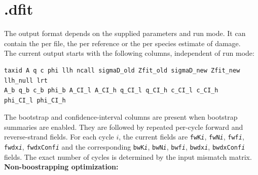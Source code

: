 \documentclass[10pt]{article}
\begin{document}
\section{.dfit}
The output format depends on the supplied parameters and run mode. It can contain the
per file, the per reference or the per species estimate of damage.\\ \noindent
The current output starts with the following columns, independent of run mode:
\begin{verbatim}
taxid A q c phi llh ncall sigmaD_old Zfit_old sigmaD_new Zfit_new llh_null lrt
A_b q_b c_b phi_b A_CI_l A_CI_h q_CI_l q_CI_h c_CI_l c_CI_h
phi_CI_l phi_CI_h
\end{verbatim}
The bootstrap and confidence-interval columns are present when bootstrap
summaries are enabled. They are followed by repeated per-cycle forward and
reverse-strand fields. For each cycle $i$, the current fields are
\texttt{fwK\textit{i}}, \texttt{fwN\textit{i}}, \texttt{fwf\textit{i}},
\texttt{fwdx\textit{i}}, \texttt{fwdxConf\textit{i}} and the corresponding
\texttt{bwK\textit{i}}, \texttt{bwN\textit{i}}, \texttt{bwf\textit{i}},
\texttt{bwdx\textit{i}}, \texttt{bwdxConf\textit{i}} fields.
The exact number of cycles is determined by the input mismatch matrix.\\ \noindent
\textbf{Non-boostrapping optimization:} \\ \noindent
\end{document}
